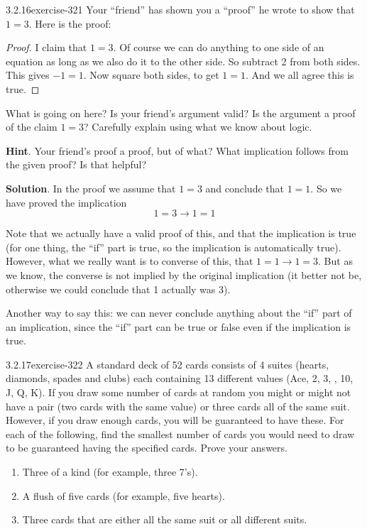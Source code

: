 \documentclass[twoside,11pt,]{book}
\numberwithin{equation}{chapter}
\newcommand{\imp}{\rightarrow}
\begin{document}
\begin{divisionsolution}{3.2.16}{}{exercise-321}%
\hypertarget{p-4188}{}%
Your ``friend'' has shown you a ``proof'' he wrote to show that \(1 = 3\). Here is the proof:%
\begin{proof}{}
\hypertarget{p-4189}{}%
I claim that \(1 = 3\). Of course we can do anything to one side of an equation as long as we also do it to the other side. So subtract 2 from both sides. This gives \(-1 = 1\). Now square both sides, to get \(1 = 1\). And we all agree this is true.%
\end{proof}
\hypertarget{p-4190}{}%
What is going on here? Is your friend's argument valid? Is the argument a proof of the claim \(1=3\)? Carefully explain using what we know about logic.%
\par\smallskip%
\noindent\textbf{Hint}.\quad%
\hypertarget{p-4191}{}%
Your friend's proof a proof, but of what?  What implication follows from the given proof?  Is that helpful?%
\par\smallskip%
\noindent\textbf{Solution}.\quad%
\hypertarget{p-4192}{}%
In the proof we assume that \(1=3\) and conclude that \(1=1\). So we have proved the implication%
\begin{equation*}
1=3 \imp 1=1
\end{equation*}
%
\par
\hypertarget{p-4193}{}%
Note that we actually have a valid proof of this, and that the implication is true (for one thing, the ``if'' part is true, so the implication is automatically true). However, what we really want is to converse of this, that \(1=1 \imp 1=3\). But as we know, the converse is not implied by the original implication (it better not be, otherwise we could conclude that 1 actually was 3).%
\par
\hypertarget{p-4194}{}%
Another way to say this: we can never conclude anything about the ``if'' part of an implication, since the ``if'' part can be true or false even if the implication is true.%
\end{divisionsolution}%
\begin{divisionsolution}{3.2.17}{}{exercise-322}%
\hypertarget{p-4195}{}%
A standard deck of 52 cards consists of 4 suites (hearts, diamonds, spades and clubs) each containing 13 different values (Ace, 2, 3, \textellipsis{}, 10, J, Q, K). If you draw some number of cards at random you might or might not have a pair (two cards with the same value) or three cards all of the same suit. However, if you draw enough cards, you will be guaranteed to have these. For each of the following, find the smallest number of cards you would need to draw to be guaranteed having the specified cards. Prove your answers.\leavevmode%
\begin{enumerate}[label=(\alph*)]
\item\hypertarget{li-2147}{}\hypertarget{p-4196}{}%
Three of a kind (for example, three 7's).%
\item\hypertarget{li-2148}{}\hypertarget{p-4197}{}%
A flush of five cards (for example, five hearts).%
\item\hypertarget{li-2149}{}\hypertarget{p-4198}{}%
Three cards that are either all the same suit or all different suits. %
\end{enumerate}
%
\end{divisionsolution}%
\end{document}
